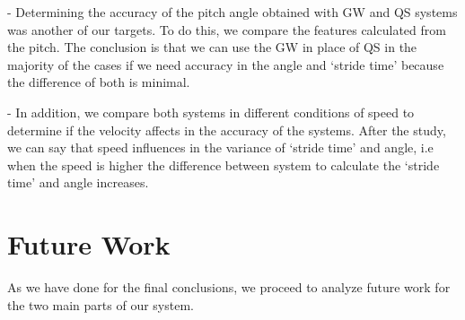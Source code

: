 \begin{itemize}
-	Determining the accuracy of the pitch angle obtained with GW and QS systems was another of our targets. To do this, we compare the features calculated from the pitch. The conclusion is that we can use the GW in place of QS in the majority of the cases if we need accuracy in the angle and ‘stride time’ because the difference of both is minimal.

-	In addition, we compare both systems in different conditions of speed to determine if the velocity affects in the accuracy of the systems. After the study, we can say that speed influences in the variance of ‘stride time’ and angle, i.e when the speed is higher the difference between system to calculate the ‘stride time’ and angle increases. 
\end{itemize}

\section{Future Work}
As we have done for the final conclusions, we proceed to analyze future work for the two main parts of our system.

